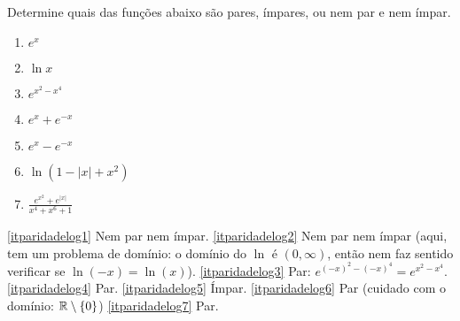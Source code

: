 \begin{exo}
Determine quais das funções abaixo são pares, ímpares, ou nem par e nem
ímpar.
\begin{multicols}{4}
\begin{enumerate}
\item\label{itparidadelog1} $e^x$
\item\label{itparidadelog2} $\ln x$
\item\label{itparidadelog3} $e^{x^2-x^4}$
\item\label{itparidadelog4} $e^x+e^{-x}$
\item\label{itparidadelog5} $e^x-e^{-x}$
\item\label{itparidadelog6} $\ln (1-|x|+x^2)$
\item\label{itparidadelog7} $\frac{e^{x^2}+e^{|x|}}{x^4+x^6+1}$
\end{enumerate}
\end{multicols}
\vspace{0.01cm}
\begin{sol}
\eqref{itparidadelog1} Nem par nem ímpar.
\eqref{itparidadelog2} Nem par nem ímpar (aqui, tem um problema de domínio: o
domínio do $\ln$ é $(0,\infty)$, então nem faz sentido verificar se 
$\ln (-x)=\ln (x)$).
\eqref{itparidadelog3} Par: $e^{(-x)^2-(-x)^4}=e^{x^2-x^4}$.
\eqref{itparidadelog4} Par.
\eqref{itparidadelog5} Ímpar.
\eqref{itparidadelog6} Par (cuidado com o domínio: $\mathbb{R}\setminus\{0\}$)
\eqref{itparidadelog7} Par.
\end{sol}
\end{exo}

